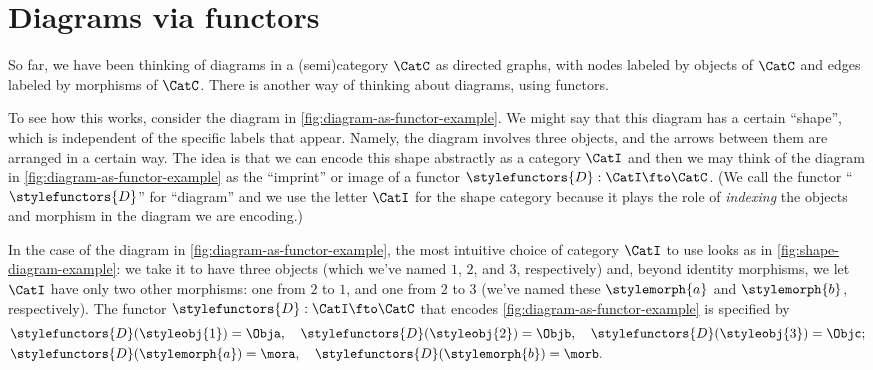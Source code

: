 
\section{Diagrams via functors}


So far, we have been thinking of diagrams in a (semi)category $\CatC$ as directed graphs, with nodes labeled by objects of $\CatC$ and edges labeled by morphisms of $\CatC$. There is another way of thinking about diagrams, using functors. 

To see how this works, consider the diagram in \cref{fig:diagram-as-functor-example}. We might say that this diagram has a certain ``shape'', which is independent of the specific labels that appear. Namely, the diagram involves three objects, and the arrows between them are arranged in a certain way. The idea is that we can encode this shape abstractly as a category $\CatI$ and then we may think of the diagram in \cref{fig:diagram-as-functor-example} as the ``imprint'' or image of a functor $\stylefunctors{D}: \CatI \fto \CatC$. (We call the functor ``$\stylefunctors{D}$'' for ``diagram'' and we use the letter $\CatI$ for the shape category because it plays the role of \emph{indexing} the objects and morphism in the diagram we are encoding.)

\begin{marginfigure}
    \centering
    \caption{}
    \label{fig:diagram-as-functor-example}
\end{marginfigure}

\begin{marginfigure}
    \centering
    \caption{}
    \label{fig:shape-diagram-example}
\end{marginfigure}


In the case of the diagram in \cref{fig:diagram-as-functor-example}, the most intuitive choice of category $\CatI$ to use looks as in \cref{fig:shape-diagram-example}: we take it to have three objects (which we've named $1$, $2$, and $3$, respectively) and, beyond identity morphisms, we let $\CatI$ have only two other morphisms: one from $2$ to $1$, and one from $2$ to $3$ (we've named these $\stylemorph{a}$ and $\stylemorph{b}$, respectively). The functor $\stylefunctors{D}: \CatI \fto \CatC$ that encodes \cref{fig:diagram-as-functor-example} is specified by 
\begin{align*}
& \stylefunctors{D}(\styleobj{1}) = \Obja, \quad \stylefunctors{D}(\styleobj{2}) = \Objb, \quad  \stylefunctors{D}(\styleobj{3}) = \Objc;  \\
& \stylefunctors{D}(\stylemorph{a}) = \mora, \quad \stylefunctors{D}(\stylemorph{b}) = \morb.
\end{align*}



